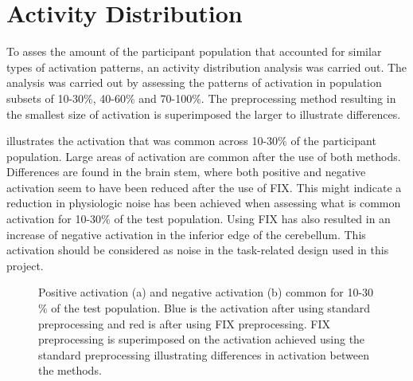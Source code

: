 \section{Activity Distribution}

To asses the amount of the participant population that accounted for similar types of activation patterns, an activity distribution analysis was carried out. The analysis was carried out by assessing the patterns of activation in population subsets of 10-30$\percent$, 40-60$\percent$ and 70-100$\percent$. The preprocessing method resulting in the smallest size of activation is superimposed the larger to illustrate differences.  

 illustrates the activation that was common across 10-30$\percent$ of the participant population. Large areas of activation are common after the use of both methods. Differences are found in the brain stem, where both positive and negative activation seem to have been reduced after the use of FIX. This might indicate a reduction in physiologic noise has been achieved when assessing what is common activation for 10-30$\percent$ of the test population. Using FIX has also resulted in an increase of negative activation in the inferior edge of the cerebellum. This activation should be considered as noise in the task-related design used in this project.

\begin{figure}[H]%
	\centering
	\qquad
	\caption{Positive activation (a) and negative activation (b) common for 10-30$\percent$ of the test population. Blue is the activation after using standard preprocessing and red is after using FIX preprocessing. FIX preprocessing is superimposed on the activation achieved using the standard preprocessing illustrating differences in activation between the methods.}
	\label{fig:10}
\end{figure}

